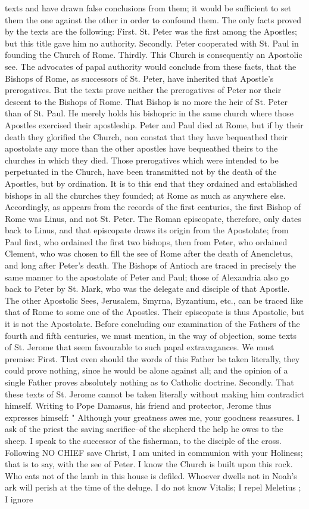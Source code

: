 texts and have drawn false conclusions from them; it would be sufficient to set them the one against the other in order to confound them. The only facts proved by the texts are the following: First. St. Peter was the first among the Apostles; but this title gave him no authority. Secondly. Peter cooperated with St. Paul in founding the Church of Rome. Thirdly. This Church is consequently an Apostolic see. The advocates of papal authority would conclude from these facts, that the Bishops of Rome, as successors of St. Peter, have inherited that Apostle's prerogatives. But the texts prove neither the prerogatives of Peter nor their descent to the Bishops of Rome. That Bishop is no more the heir of St. Peter than of St. Paul. He merely holds his bishopric in the same church where those Apostles exercised their apostleship. Peter and Paul died at Rome, but if by their death they glorified the Church, non constat that they have bequeathed their apostolate any more than the other apostles have bequeathed theirs to the churches in which they died. Those prerogatives which were intended to be perpetuated in the Church, have been transmitted not by the death of the Apostles, but by ordination. It is to this end that they ordained and established bishops in all the churches they founded; at Rome as much as anywhere else. Accordingly, as appears from the records of the first centuries, the first Bishop of Rome was Linus, and not St. Peter. The Roman episcopate, therefore, only dates back to Linus, and that episcopate draws its origin from the Apostolate; from Paul first, who ordained the first two bishops, then from Peter, who ordained Clement, who was chosen to fill the see of Rome after the death of Anencletus, and long after Peter's death. The Bishops of Antioch are traced in precisely the same manner to the apostolate of Peter and Paul; those of Alexandria also go back to Peter by St. Mark, who was the delegate and disciple of that Apostle. The other Apostolic Sees, Jerusalem, Smyrna, Byzantium, etc., can be traced like that of Rome to some one of the Apostles. Their episcopate is thus Apostolic, but it is not the Apostolate. Before concluding our examination of the Fathers of the fourth and fifth centuries, we must mention, in the way of objection, some texts of St. Jerome that seem favourable to such papal extravagances. We must premise: First. That even should the words of this Father be taken literally, they could prove nothing, since he would be alone against all; and the opinion of a single Father proves absolutely nothing as to Catholic doctrine. Secondly. That these texts of St. Jerome cannot be taken literally without making him contradict himself. Writing to Pope Damasus, his friend and protector, Jerome thus expresses himself: " Although your greatness awes me, your goodness reassures. I ask of the priest the saving sacrifice--of the shepherd the help he owes to the sheep. I speak to the successor of the fisherman, to the disciple of the cross. Following NO CHIEF save Christ, I am united in communion with your Holiness; that is to say, with the see of Peter. I know the Church is built upon this rock. Who eats not of the lamb in this house is defiled. Whoever dwells not in Noah's ark will perish at the time of the deluge. I do not know Vitalis; I repel Meletius ; I ignore 